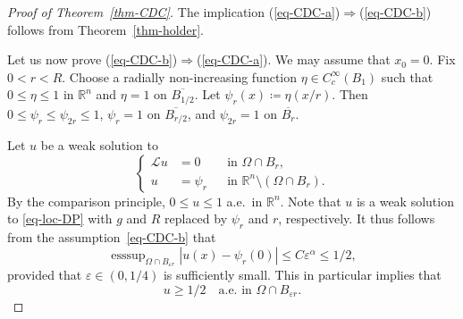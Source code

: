 \documentclass[11pt]{amsart}
\theoremstyle{plain}
\theoremstyle{definition}
\numberwithin{equation}{section}
\DeclareMathOperator*{\esssup}{esssup}
\begin{document}
\begin{proof}[Proof of Theorem~\ref{thm-CDC}]
The implication (\ref{eq-CDC-a})$\Rightarrow$(\ref{eq-CDC-b}) follows from Theorem~\ref{thm-holder}.

Let us now prove (\ref{eq-CDC-b})$\Rightarrow$(\ref{eq-CDC-a}).
We may assume that $x_0=0$. Fix $0<r<R$. Choose a radially non-increasing function $\eta \in C^\infty_c(B_1)$ such that $0 \leq \eta \leq 1$ in $\mathbb{R}^n$ and $\eta=1$ on $\overline{B_{1/2}}$. Let $\psi_r(x) \coloneqq \eta(x/r)$. Then $0 \leq \psi_r \leq \psi_{2r} \leq 1$, $\psi_r=1$ on $\overline{B_{r/2}}$, and $\psi_{2r}=1$ on $\overline{B_r}$.

Let $u$ be a weak solution to
\begin{equation*}
\left\{
\begin{aligned}
\mathcal{L}u &=0 &&\text{in }\Omega \cap B_r, \\
u &=\psi_r &&\text{in }\mathbb{R}^n \setminus (\Omega \cap B_r).
\end{aligned}
\right.
\end{equation*}
By the comparison principle, $0\leq u \leq 1$ a.e.\ in $\mathbb{R}^n$. Note that $u$ is a weak solution to \eqref{eq-loc-DP} with $g$ and $R$ replaced by $\psi_r$ and $r$, respectively. It thus follows from the assumption~\eqref{eq-CDC-b} that
\begin{equation*}
\esssup_{\Omega \cap B_{\varepsilon r}} |u(x)-\psi_r(0)| \leq C \varepsilon^\alpha \leq 1/2,
\end{equation*}
provided that $\varepsilon \in (0, 1/4)$ is sufficiently small. This in particular implies that
\begin{equation}\label{eq-u-large}
u \geq 1/2 \quad\text{a.e.\ in }\Omega \cap B_{\varepsilon r}.
\end{equation}


\end{proof}
\end{document}
